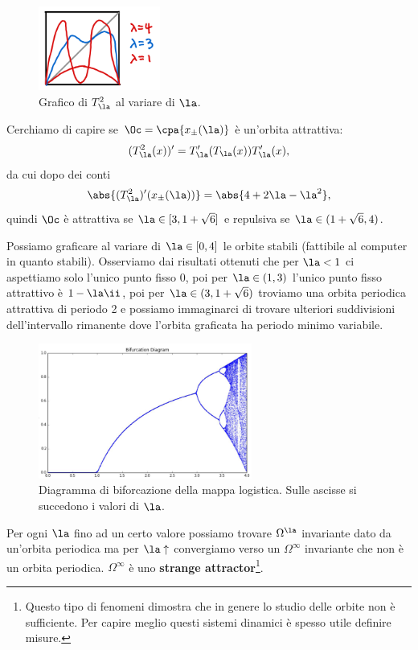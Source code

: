 \begin{figure}[!htb]
    \centering
    \includegraphics[width=4cm]{Immagini/Seconda_iterata_Logistica.png}
    \caption{Grafico di $T^2_\la$ al variare di $\la$.}
    \label{LogisticaIterata}
\end{figure}

\noindent
Cerchiamo di capire se $\Oc=\cpa{x_{\pm}(\la)}$ \`e un'orbita attrattiva:
\[(T_\la^2(x))'=T_\la'(T_\la(x))T'_\la(x),\]
da cui dopo dei conti
\[\abs{(T^2_\la)'(x_{\pm}(\la))}=\abs{4+2\la-\la^2},\]
quindi $\Oc$ \`e attrattiva se $\la\in [3,1+\sqrt 6]$ e repulsiva se $\la\in (1+\sqrt 6,4)$.
\vspace{0.25cm}

\noindent Possiamo graficare al variare di $\la\in [0,4]$ le orbite stabili (fattibile al computer in quanto stabili). 
Osserviamo dai risultati ottenuti che per $\la<1$ ci aspettiamo solo l'unico punto fisso $0$, poi per $\la\in(1,3)$ l'unico punto fisso attrattivo \`e $1-\la\ii$, poi per $\la\in (3,1+\sqrt 6)$ troviamo una orbita periodica attrattiva di periodo 2 e possiamo immaginarci di trovare ulteriori suddivisioni dell'intervallo rimanente dove l'orbita graficata ha periodo minimo variabile.

\begin{figure}[!htb]
    \centering
    \includegraphics[width=7cm]{Immagini/Diagramma_biforcazione_logistica.png}
    \caption{Diagramma di biforcazione della mappa logistica. Sulle ascisse si succedono i valori di $\la$.}
\end{figure}
\noindent
Per ogni $\la$ fino ad un certo valore possiamo trovare $\Omega^\la$ invariante dato da un'orbita periodica ma per $\la\uparrow$ convergiamo verso un $\Omega^\infty$ invariante che non \`e un orbita periodica. $\Omega^\infty$ \`e uno \textbf{strange attractor}\footnote{Questo tipo di fenomeni dimostra che in genere lo studio delle orbite non \`e sufficiente. Per capire meglio questi sistemi dinamici \`e spesso utile definire misure.}.




